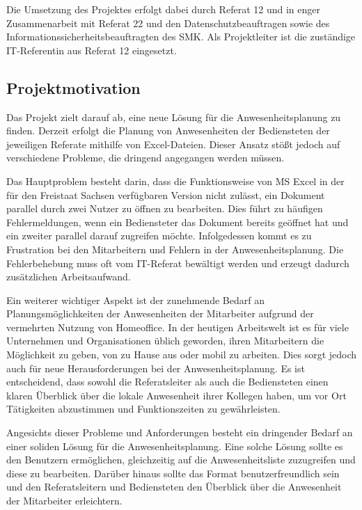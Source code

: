 Die Umsetzung des Projektes erfolgt dabei durch Referat 12 und in enger Zusammenarbeit mit Referat 22 und den Datenschutzbeauftragen sowie des Informationssicherheitsbeauftragten des SMK. Als Projektleiter ist die zuständige IT-Referentin aus Referat 12 eingesetzt.

\subsection{Projektmotivation}
\label{sec:Projektmotivation}
Das Projekt zielt darauf ab, eine neue Lösung für die Anwesenheitsplanung zu finden. Derzeit erfolgt die Planung von Anwesenheiten der Bediensteten der jeweiligen Referate mithilfe von Excel-Dateien. Dieser Ansatz stößt jedoch auf verschiedene Probleme, die dringend angegangen werden müssen.

Das Hauptproblem besteht darin, dass die Funktionsweise von MS Excel in der für den Freistaat Sachsen verfügbaren Version nicht zulässt, ein Dokument parallel durch zwei Nutzer zu öffnen \bzw zu bearbeiten. Dies führt zu häufigen Fehlermeldungen, wenn ein Bediensteter das Dokument bereits geöffnet hat und ein zweiter parallel darauf zugreifen möchte. Infolgedessen kommt es zu Frustration bei den Mitarbeitern und Fehlern in der Anwesenheitsplanung. Die Fehlerbehebung muss oft vom IT-Referat bewältigt werden und erzeugt dadurch zusätzlichen Arbeitsaufwand.

Ein weiterer wichtiger Aspekt ist der zunehmende Bedarf an Planungsmöglichkeiten der Anwesenheiten der Mitarbeiter aufgrund der vermehrten Nutzung von Homeoffice. In der heutigen Arbeitswelt ist es für viele Unternehmen und Organisationen üblich geworden, ihren Mitarbeitern die Möglichkeit zu geben, von zu Hause aus oder mobil zu arbeiten. Dies sorgt jedoch auch für neue Herausforderungen bei der Anwesenheitsplanung. Es ist entscheidend, dass sowohl die Referatsleiter als auch die Bediensteten einen klaren Überblick über die lokale Anwesenheit ihrer Kollegen haben, um vor Ort Tätigkeiten abzustimmen und \zB Funktionszeiten zu gewährleisten.

Angesichts dieser Probleme und Anforderungen besteht ein dringender Bedarf an einer soliden Lösung für die Anwesenheitsplanung. Eine solche Lösung sollte es den Benutzern ermöglichen, gleichzeitig auf die Anwesenheitsliste zuzugreifen und diese zu bearbeiten. Darüber hinaus sollte das Format benutzerfreundlich sein und den Referatsleitern und Bediensteten den Überblick über die Anwesenheit der Mitarbeiter erleichtern.


